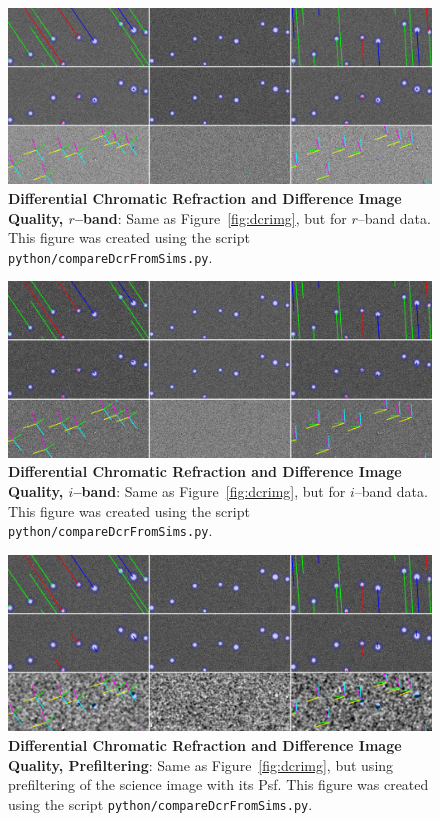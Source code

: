 \documentclass[DM,toc]{lsstdoc}
\begin{document}
\begin{figure}[!ht]
  \centering
  \includegraphics[width=1.0\textwidth]{outputs8b_r_doPreConvolveFalse_dcr_crop.png}
  \caption{{\bf Differential Chromatic Refraction and Difference Image
      Quality, $r$--band}: Same as Figure~\ref{fig:dcrimg}, but for
    $r$--band data.  This figure was created using the script {\tt
      python/compareDcrFromSims.py}.}
  \label{fig:dcrimr}
\end{figure}

\begin{figure}[!ht]
  \centering
  \includegraphics[width=1.0\textwidth]{outputs8b_i_doPreConvolveFalse_dcr_crop.png}
  \caption{{\bf Differential Chromatic Refraction and Difference Image
      Quality, $i$--band}: Same as Figure~\ref{fig:dcrimg}, but for
    $i$--band data.  This figure was created using the script {\tt
      python/compareDcrFromSims.py}.}
  \label{fig:dcrimi}
\end{figure}

\begin{figure}[!ht]
  \centering
  \includegraphics[width=1.0\textwidth]{outputs8b_g_doPreConvolveTrue_dcr_crop.png}
  \caption{{\bf Differential Chromatic Refraction and Difference Image
      Quality, Prefiltering}: Same as Figure~\ref{fig:dcrimg}, but
    using prefiltering of the science image with its Psf.  This figure
    was created using the script {\tt python/compareDcrFromSims.py}.}
  \label{fig:dcrimgpre}
\end{figure}
\end{document}
